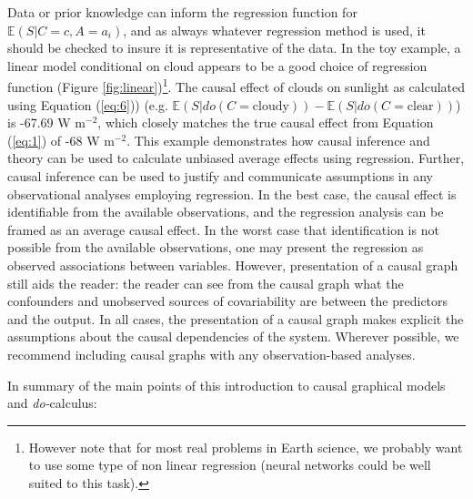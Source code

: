 \documentclass[12pt]{article}
\begin{document}
Data or prior knowledge can inform the regression function for
$\mathbb{E}(S | C=c, A=a_i)$, and as always whatever regression method
is used, it should be checked to insure it is representative of the
data. In the toy example, a linear model conditional on cloud appears
to be a good choice of regression function (Figure
\ref{fig:linear})\footnote{However note that for most real problems in
  Earth science, we probably want to use some type of non linear
  regression (neural networks could be well suited to this
  task).}. The causal effect of clouds on sunlight as calculated using
Equation (\ref{eq:6})) (e.g.
$\mathbb{E}(S | do(C = \text{cloudy})) - \mathbb{E}(S | do(C =
\text{clear}))$) is -67.69 W m$^{-2}$, which closely matches the true
causal effect from Equation (\ref{eq:1}) of -68 W m$^{-2}$. This
example demonstrates how causal inference and theory can be used to
calculate unbiased average effects using regression. Further, causal
inference can be used to justify and communicate assumptions in any
observational analyses employing regression. In the best case, the
causal effect is identifiable from the available observations, and the
regression analysis can be framed as an average causal effect. In the
worst case that identification is not possible from the available
observations, one may present the regression as observed associations
between variables. However, presentation of a causal graph still aids
the reader: the reader can see from the causal graph what the
confounders and unobserved sources of covariability are between the
predictors and the output. In all cases, the presentation of a causal
graph makes explicit the assumptions about the causal dependencies of
the system. Wherever possible, we recommend including causal graphs
with any observation-based analyses.

In summary of the main points of this introduction to causal graphical
models and \textit{do-}calculus:
\end{document}
